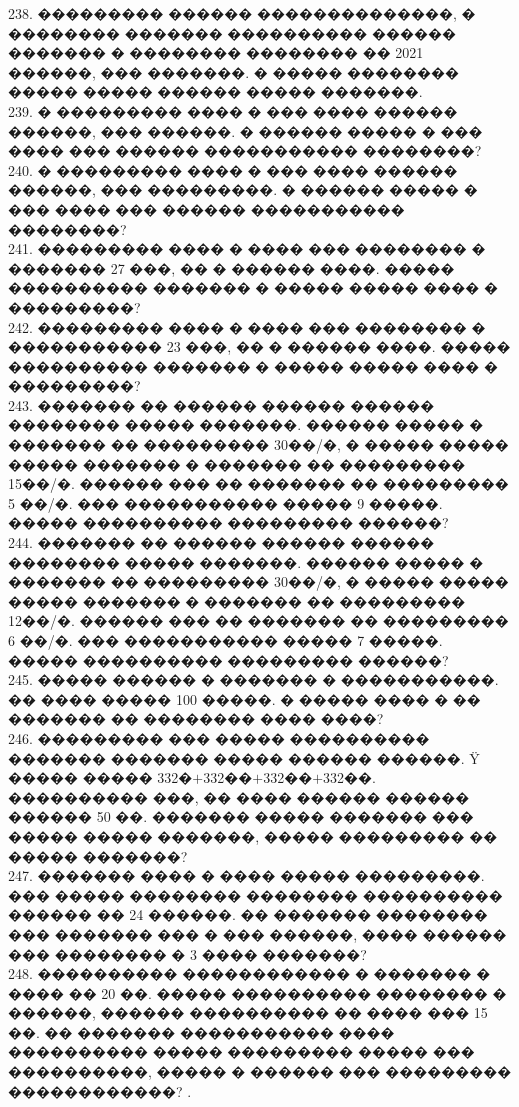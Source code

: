 \documentclass[12pt]{article}
\begin{document}
238. ��������� ������ ��������������, � �������� ������� ���������� ������ ������� � �������� �������� �� 2021 ������, ��� �������. � ����� �������� ����� ����� ������ ����� �������.\\
239. � ��������� ���� � ��� ���� ������ ������, ��� ������. � ������ ����� � ��� ���� ��� ������ ����������� ��������?\\
240. � ��������� ���� � ��� ���� ������ ������, ��� ���������. � ������ ����� � ��� ���� ��� ������ ����������� ��������?\\
241. ��������� ���� � ���� ��� �������� � ������� 27 ���, �� � ������ ����. ����� ���������� ������� � ����� ����� ���� � ���������?\\
242. ��������� ���� � ���� ��� �������� � ����������� 23 ���, �� � ������ ����. ����� ���������� ������� � ����� ����� ���� � ���������?\\
243. ������� �� ������ ������ ������ �������� ����� �������. ������ ����� � ������� �� ��������� 30��/�, � ����� ����� ����� ������� � ������� �� ��������� 15��/�. ������ ��� �� ������� �� ��������� 5 ��/�. ��� ����������� ����� 9 �����. ����� ���������� ��������� ������?\\
244. ������� �� ������ ������ ������ �������� ����� �������. ������ ����� � ������� �� ��������� 30��/�, � ����� ����� ����� ������� � ������� �� ��������� 12��/�. ������ ��� �� ������� �� ��������� 6 ��/�. ��� ����������� ����� 7 �����. ����� ���������� ��������� ������?\\
245. ����� ������ � ������� � �����������. �� ���� ����� 100 �����. � ����� ���� � �� ������� �� �������� ���� ����?\\
246. ��������� ��� ����� ���������� ������� ������� ����� ������ ������. Ÿ ����� ����� 332�$+$332��$+$332��$+$332��. ���������� ���, �� ���� ������ ������ ������ 50 ��. ������� ����� ������� ��� ����� ����� �������, ����� ��������� �� ����� �������?\\
247. ������� ���� � ���� ����� ���������. ��� ����� �������� �������� ���������� ������ �� 24 ������. �� ������� �������� ��� ������� ��� � ��� ������, ���� ������ ��� �������� � 3 ���� �������?\\
248. ���������� ������������ � ������� � ���� �� 20 ��. ����� ���������� �������� � ������, ������ ���������� �� ���� ��� 15 ��. �� ������� ����������� ���� ���������� ����� ��������� ����� ��� ����������, ����� � ������ ��� ��������� ������������?\newpage
{}. \begin{center}
\begin{figure}[ht!]
\end{figure}
\end{center}
\end{document}
